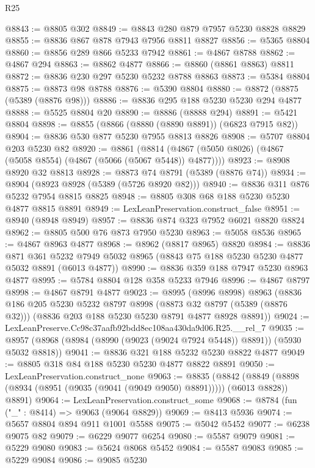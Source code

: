 \begin{lexlean}{R25}
\begin{coremodule}
@8843 := @8805 @302
@8849 := @8843 @280 @879 @7957 @5230 @8828 @8829
@8855 := @8836 @867 @878 @7943 @7956 @8811 @8827
@8856 := @5365 @8804
@8860 := @8856 @289 @866 @5233 @7942
@8861 := @4867 @8788
@8862 := @4867 @294
@8863 := @8862 @4877
@8866 := @8860 (@8861 @8863) @8811
@8872 := @8836 @230 @297 @5230 @5232 @8788 @8863
@8873 := @5384 @8804
@8875 := @8873 @98 @8788
@8876 := @5390 @8804
@8880 := @8872 (@8875 (@5389 (@8876 @98)))
@8886 := @8836 @295 @188 @5230 @5230 @294 @4877
@8888 := @5525 @8804 @20
@8890 := @8886 (@8888 @294)
@8891 := @5421 @8804
@8898 := @8855 (@8866 (@8880 (@8890 @8891)) (@6823 @7915 @82))
@8904 := @8836 @530 @877 @5230 @7955 @8813 @8826
@8908 := @5707 @8804 @203 @5230 @82
@8920 := @8861
    (@8814 (@4867 (@5050 @8026) (@4867 (@5058 @8554) (@4867 (@5066 (@5067 @5448)) @4877))))
@8923 := @8908 @8920 @32 @8813
@8928 := @8873 @74 @8791 (@5389 (@8876 @74))
@8934 := @8904 (@8923 @8928 (@5389 (@5726 @8920 @82)))
@8940 := @8836 @311 @876 @5232 @7954 @8815 @8825
@8948 := @8805 @308 @68 @188 @5230 @5230 @4877 @8815 @8891
@8949 := LexLeanPreservation.construct_false
@8951 := @8940 (@8948 @8949)
@8957 := @8836 @874 @323 @7952 @6021 @8820 @8824
@8962 := @8805 @500 @76 @873 @7950 @5230
@8963 := @5058 @8536
@8965 := @4867 @8963 @4877
@8968 := @8962 (@8817 @8965) @8820
@8984 := @8836
    @871
    @361
    @5232
    @7949
    @5032
    @8965
    (@8843 @75 @188 @5230 @5230 @4877 @5032 @8891 (@6013 @4877))
@8990 := @8836 @359 @188 @7947 @5230 @8963 @4877
@8995 := @5784 @8804 @128 @358 @5233 @7946
@8996 := @4867 @8797
@8998 := @4867 @8791 @4877
@9023 := @8995
    (@8996 @8998)
    @8963
    (@8836
      @186
      @205
      @5230
      @5232
      @8797
      @8998
      (@8873 @32 @8797 (@5389 (@8876 @32)))
      (@8836 @203 @188 @5230 @5230 @8791 @4877 @8928 @8891))
@9024 := LexLeanPreserve.Cc98c37aafb92bdd8ec108aa430da9d06.R25.__rel_7
@9035 := @8957 (@8968 (@8984 (@8990 (@9023 (@9024 @7924 @5448)) @8891)) (@5930 @5032 @8818))
@9041 := @8836 @321 @188 @5232 @5230 @8822 @4877
@9049 := @8805 @318 @84 @188 @5230 @5230 @4877 @8822 @8891
@9050 := LexLeanPreservation.construct_none
@9063 := @8835
    (@8842 (@8849 (@8898 (@8934 (@8951 (@9035 (@9041 (@9049 @9050) @8891))))) (@6013 @8828)) @8891)
@9064 := LexLeanPreservation.construct_some
@9068 := @8784 (fun ("_" : @8414) => @9063 (@9064 @8829))
@9069 := @8413 @5936
@9074 := @5657 @8804 @894 @911 @1001 @5588
@9075 := @5042 @5452
@9077 := @6238 @9075 @82
@9079 := @6229 @9077 @6254
@9080 := @5587 @9079
@9081 := @5229 @9080
@9083 := @5624 @8068 @5452
@9084 := @5587 @9083
@9085 := @5229 @9084
@9086 := @9085 @5230

\end{coremodule}
\end{lexlean}
